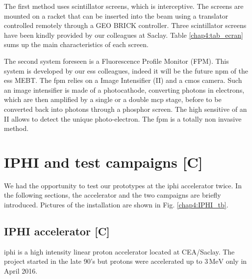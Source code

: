 \begin{refsection}
  The first method uses scintillator screens, which is interceptive. The screens are mounted on a racket that can be inserted into the beam using a translator controlled remotely through a GEO BRICK controller. Three scintillator screens have been kindly provided by our colleagues at Saclay. Table \ref{chap4:tab_ecran} sums up the main characteristics of each screen.

  

  The second system foreseen is a Fluorescence Profile Monitor (FPM). This system is developed by our \acrshort{ess} colleagues, indeed it will be the future \acrshort{npm} of the \acrshort{ess} MEBT. The \acrshort{fpm} relies on a Image Intensifier (II) and a \acrshort{cmos} camera.
  Such an image intensifier is made of a photocathode, converting photons in electrons, which are then amplified by a single or a double \acrshort{mcp} stage, before to be converted back into photons through a phosphor screen. The high sensitive of an II allows to detect the unique photo-electron. The \acrshort{fpm} is a totally non invasive method.



  \section{IPHI and test campaigns [C]}
  We had the opportunity to test our prototypes at the \acrshort{iphi} accelerator twice. In the following sections, the accelerator and the two campaigns are briefly introduced. Pictures of the installation are shown in Fig. \ref{chap4:IPHI_tb}.

  \subsection{IPHI accelerator [C]}
  \acrshort{iphi} is a high intensity linear proton accelerator located at CEA/Saclay.
  The project started in the late 90's\cite{Beau2000} but protons were accelerated up to $3\,\mathrm{MeV}$ only in April 2016\cite{Gobin2016}.


\end{refsection}
